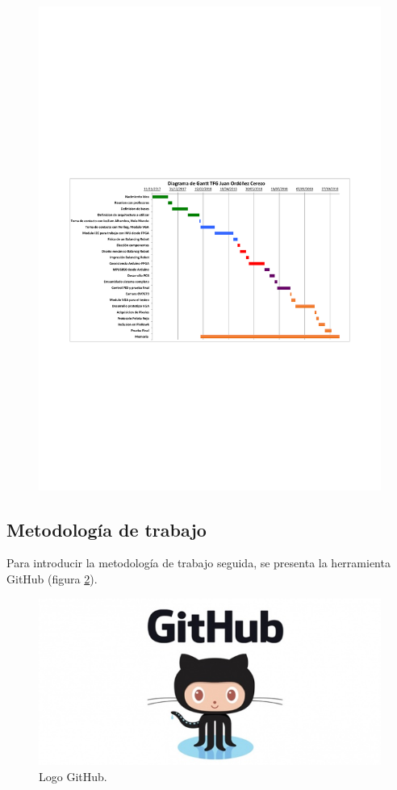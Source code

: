 \begin{center}
	\begin{figure}[H]
		\center
		\includegraphics[trim = 15mm 85mm 0mm 100mm,clip, angle=-90, scale = 1.4]{imagenes/Introduction/Gantt.pdf}
		\label{fig:diagramaGantt}
	\end{figure}
\end{center}
\subsection{Metodología de trabajo}
Para introducir la metodología de trabajo seguida, se presenta la herramienta GitHub (figura \ref{fig:github}).\newline 

\begin{figure}[H]
	\center
	\includegraphics[trim = 0mm 0mm 0mm 0mm, clip,scale=0.4]{imagenes/Introduction/github}
	\caption{Logo GitHub.}
	\label{fig:github}
\end{figure}


